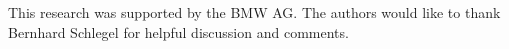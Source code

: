 \begin{ack}
This research was supported by the BMW AG. The authors would like to thank Bernhard Schlegel for helpful discussion and comments. 
\end{ack}
